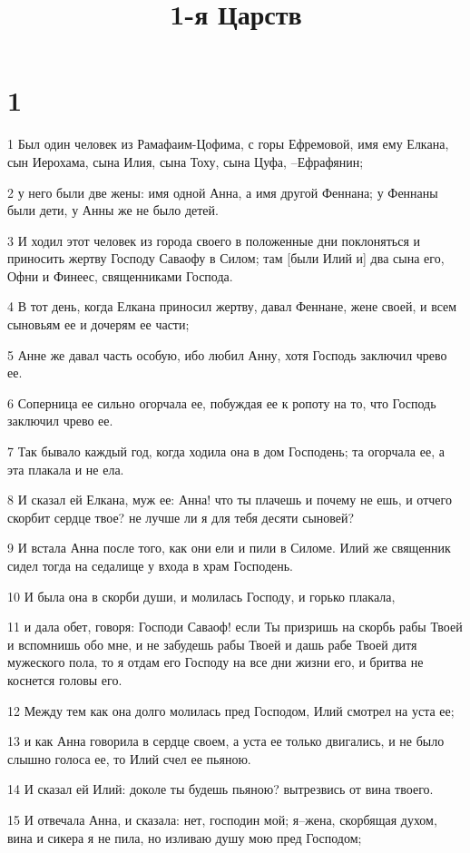 

\title{1-я Царств}


\chapter{1}

\par 1 Был один человек из Рамафаим-Цофима, с горы Ефремовой, имя ему Елкана, сын Иерохама, сына Илия, сына Тоху, сына Цуфа, --Ефрафянин;
\par 2 у него были две жены: имя одной Анна, а имя другой Феннана; у Феннаны были дети, у Анны же не было детей.
\par 3 И ходил этот человек из города своего в положенные дни поклоняться и приносить жертву Господу Саваофу в Силом; там [были Илий и] два сына его, Офни и Финеес, священниками Господа.
\par 4 В тот день, когда Елкана приносил жертву, давал Феннане, жене своей, и всем сыновьям ее и дочерям ее части;
\par 5 Анне же давал часть особую, ибо любил Анну, хотя Господь заключил чрево ее.
\par 6 Соперница ее сильно огорчала ее, побуждая ее к ропоту на то, что Господь заключил чрево ее.
\par 7 Так бывало каждый год, когда ходила она в дом Господень; та огорчала ее, а эта плакала и не ела.
\par 8 И сказал ей Елкана, муж ее: Анна! что ты плачешь и почему не ешь, и отчего скорбит сердце твое? не лучше ли я для тебя десяти сыновей?
\par 9 И встала Анна после того, как они ели и пили в Силоме. Илий же священник сидел тогда на седалище у входа в храм Господень.
\par 10 И была она в скорби души, и молилась Господу, и горько плакала,
\par 11 и дала обет, говоря: Господи Саваоф! если Ты призришь на скорбь рабы Твоей и вспомнишь обо мне, и не забудешь рабы Твоей и дашь рабе Твоей дитя мужеского пола, то я отдам его Господу на все дни жизни его, и бритва не коснется головы его.
\par 12 Между тем как она долго молилась пред Господом, Илий смотрел на уста ее;
\par 13 и как Анна говорила в сердце своем, а уста ее только двигались, и не было слышно голоса ее, то Илий счел ее пьяною.
\par 14 И сказал ей Илий: доколе ты будешь пьяною? вытрезвись от вина твоего.
\par 15 И отвечала Анна, и сказала: нет, господин мой; я--жена, скорбящая духом, вина и сикера я не пила, но изливаю душу мою пред Господом;
